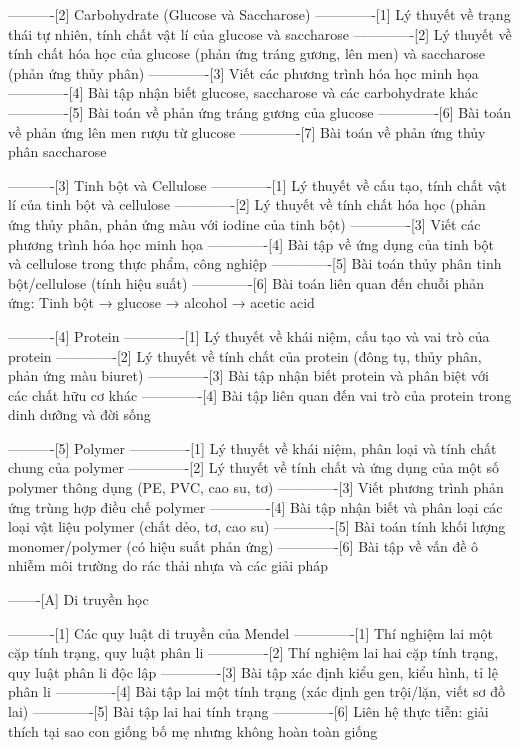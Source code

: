 ----------[2] Carbohydrate (Glucose và Saccharose)
-------------[1] Lý thuyết về trạng thái tự nhiên, tính chất vật lí của glucose và saccharose
-------------[2] Lý thuyết về tính chất hóa học của glucose (phản ứng tráng gương, lên men) và saccharose (phản ứng thủy phân)
-------------[3] Viết các phương trình hóa học minh họa
-------------[4] Bài tập nhận biết glucose, saccharose và các carbohydrate khác
-------------[5] Bài toán về phản ứng tráng gương của glucose
-------------[6] Bài toán về phản ứng lên men rượu từ glucose
-------------[7] Bài toán về phản ứng thủy phân saccharose

----------[3] Tinh bột và Cellulose
-------------[1] Lý thuyết về cấu tạo, tính chất vật lí của tinh bột và cellulose
-------------[2] Lý thuyết về tính chất hóa học (phản ứng thủy phân, phản ứng màu với iodine của tinh bột)
-------------[3] Viết các phương trình hóa học minh họa
-------------[4] Bài tập về ứng dụng của tinh bột và cellulose trong thực phẩm, công nghiệp
-------------[5] Bài toán thủy phân tinh bột/cellulose (tính hiệu suất)
-------------[6] Bài toán liên quan đến chuỗi phản ứng: Tinh bột → glucose → alcohol → acetic acid

----------[4] Protein
-------------[1] Lý thuyết về khái niệm, cấu tạo và vai trò của protein
-------------[2] Lý thuyết về tính chất của protein (đông tụ, thủy phân, phản ứng màu biuret)
-------------[3] Bài tập nhận biết protein và phân biệt với các chất hữu cơ khác
-------------[4] Bài tập liên quan đến vai trò của protein trong dinh dưỡng và đời sống

----------[5] Polymer
-------------[1] Lý thuyết về khái niệm, phân loại và tính chất chung của polymer
-------------[2] Lý thuyết về tính chất và ứng dụng của một số polymer thông dụng (PE, PVC, cao su, tơ)
-------------[3] Viết phương trình phản ứng trùng hợp điều chế polymer
-------------[4] Bài tập nhận biết và phân loại các loại vật liệu polymer (chất dẻo, tơ, cao su)
-------------[5] Bài toán tính khối lượng monomer/polymer (có hiệu suất phản ứng)
-------------[6] Bài tập về vấn đề ô nhiễm môi trường do rác thải nhựa và các giải pháp

-------[A] Di truyền học

----------[1] Các quy luật di truyền của Mendel
-------------[1] Thí nghiệm lai một cặp tính trạng, quy luật phân li
-------------[2] Thí nghiệm lai hai cặp tính trạng, quy luật phân li độc lập
-------------[3] Bài tập xác định kiểu gen, kiểu hình, tỉ lệ phân li
-------------[4] Bài tập lai một tính trạng (xác định gen trội/lặn, viết sơ đồ lai)
-------------[5] Bài tập lai hai tính trạng
-------------[6] Liên hệ thực tiễn: giải thích tại sao con giống bố mẹ nhưng không hoàn toàn giống

